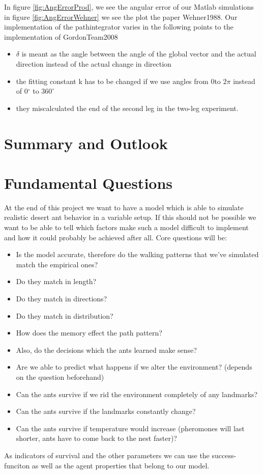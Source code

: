 \documentclass[11pt]{article}
\begin{document}
In figure \ref{fig:AngErrorProd}, we see the angular error of our Matlab simulations in figure \ref{fig:AngErrorWehner} we see the plot the paper Wehner1988\cite{Wehner1988}. Our implementation of the pathintegrator varies in the following points to the implementation of GordonTeam2008 \cite{GordonTeam2008}

\begin{itemize}
\item $\delta$ is meant as the angle between the angle of the global vector and the actual direction instead of the actual change in direction
\item the fitting constant k has to be changed if we use angles from $0 $to $2 \pi$ instead of 0$^\circ$ to $360^\circ$
\item they miscalculated the end of the second leg in the two-leg experiment.

\end{itemize}




\section{Summary and Outlook}
\section*{Fundamental Questions}
At the end of this project we want to have a model which is able to simulate realistic desert ant behavior in a variable setup. If this should not be possible we want to be able to tell which factors make such a model difficult to implement and how it could probably be achieved after all.
Core questions will be:
\begin{itemize}
\item Is the model accurate, therefore do the walking patterns that we've simulated match the empirical ones?
\item Do they match in length?
\item Do they match in directions?
\item Do they match in distribution?
\item How does the memory effect the path pattern?
\item Also, do the decisions which the ants learned make sense?
\item Are we able to predict what happens if we alter the environment? (depends on the question beforehand)
\item Can the ants survive if we rid the environment completely of any landmarks?
\item Can the ants survive if the landmarks constantly change?
\item Can the ants survive if temperature would increase (pheromones will last shorter, ants have to come back to the nest faster)? 
\end{itemize}
As indicators of survival and the other parameters we can use the success-funciton as well as the agent properties that belong to our model.
\end{document}
